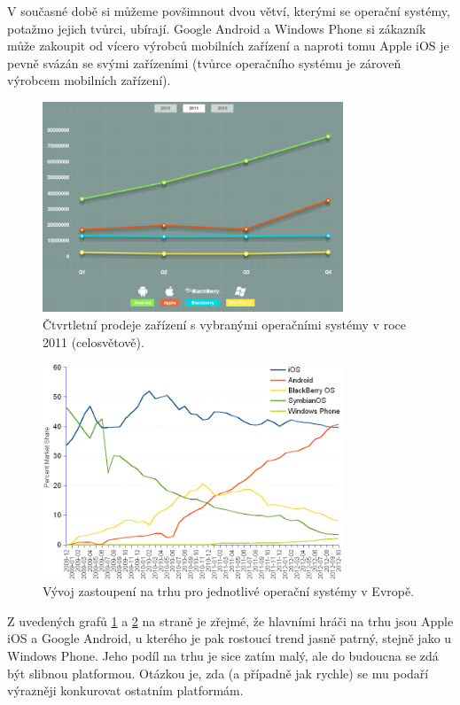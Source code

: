 \documentclass[thesis=M,czech]{FITthesis}[2012/06/26]
\begin{document}
V současné době si můžeme povšimnout dvou větví, kterými se operační systémy, potažmo jejich tvůrci, ubírají. Google Android a Windows Phone si zákazník může zakoupit od vícero výrobců mobilních zařízení a naproti tomu Apple iOS je pevně svázán se svými zařízeními (tvůrce operačního systému je zároveň výrobcem mobilních zařízení).

\begin{figure}[p]\centering
	\includegraphics[width=0.8\textwidth]{figures/sales_2011}
	\caption{Čtvrtletní prodeje zařízení s vybranými operačními systémy v roce 2011 (celosvětově).\protect\cite{mobile_stats}}
	\label{fig:sales_world}
\end{figure}
\begin{figure}[p]\centering
	\includegraphics[width=0.8\textwidth]{figures/mobios_eu_timeseries_800x574}
	\caption{Vývoj zastoupení na trhu pro jednotlivé operační systémy v Evropě.\protect\cite{market_share}}
	\label{fig:sales_europe}
\end{figure}

Z uvedených grafů \ref{fig:sales_world} a \ref{fig:sales_europe} na straně \pageref{fig:sales_world} je zřejmé, že hlavními hráči na trhu jsou Apple iOS a Google Android, u kterého je pak rostoucí trend jasně patrný, stejně jako u Windows Phone. Jeho podíl na trhu je sice zatím malý, ale do budoucna se zdá být slibnou platformou. Otázkou je, zda (a případně jak rychle) se mu podaří výrazněji konkurovat ostatním platformám.
\end{document}

